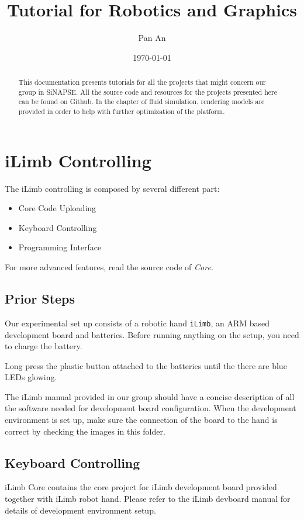 \documentclass[11pt]{article}
\author{Pan An}
\date{\today}
\title{Tutorial for Robotics and Graphics}
\begin{document}
\maketitle
\setcounter{tocdepth}{2}
\tableofcontents

\newpage
\begin{abstract}
This documentation presents tutorials for all the projects that might concern our group in SiNAPSE. All the source code and resources for the projects presented here can be found on Github. In the chapter of fluid simulation, rendering models are provided in order to help with further optimization of the platform.
\end{abstract}

\newpage
\section{iLimb Controlling}
\label{sec:orgheadline5}
The iLimb controlling is composed by several different part:
\begin{itemize}
\item Core Code Uploading
\item Keyboard Controlling
\item Programming Interface
\end{itemize}

For more advanced features, read the source code of \emph{Core}. 

\subsection{Prior Steps}
\label{sec:orgheadline1}
Our experimental set up consists of a robotic hand \texttt{iLimb}, an ARM based development board and batteries. Before running anything on the setup, you need to charge the battery.

Long press the plastic button attached to the batteries until the there are blue LEDs glowing.  

The iLimb manual provided in our group should have a concise description of all the software needed for development board configuration. When the development environment is set up, make sure the connection of the board to the hand is correct by checking the images in this folder. 

\subsection{Keyboard Controlling}
\label{sec:orgheadline3}
iLimb Core contains the core project for iLimb development board provided together with iLimb robot hand. Please refer to the iLimb devboard manual for details of development environment setup. 
\end{document}
